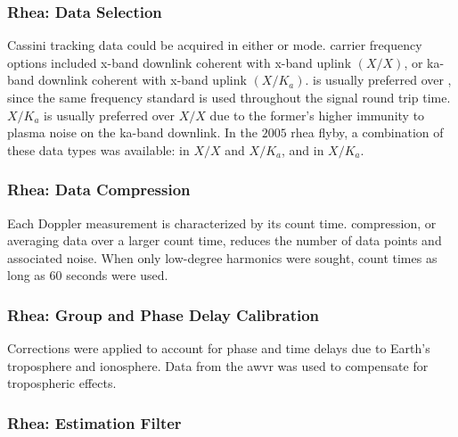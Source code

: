 \documentclass{article}
\theoremstyle{mystyle}
\begin{document}
\subsubsection{\footnotesize Rhea: Data Selection}

Cassini tracking data could be acquired in either  or  mode. \Gls{carrier} frequency options included \gls{x-band} \gls{downlink} \gls{coherent} with \gls{x-band} \gls{uplink} $(X/X)$, or \gls{ka-band} \gls{downlink} \gls{coherent} with \gls{x-band} uplink $(X/K_{a})$.  is usually preferred over , since the same \gls{frequency} standard is used throughout the signal round trip time. $X/K_{a}$ is usually preferred over $X/X$ due to the former’s higher immunity to \gls{plasma} noise on the \gls{ka-band} \gls{downlink}. In the $2005$ \gls{rhea} flyby, a combination of these data types was available:  in $X/X$ and $X/K_{a}$, and  in $X/K_{a}$.

\subsubsection{\footnotesize Rhea: Data Compression}

Each Doppler measurement is characterized by its count time. \Gls{compression}, or averaging data over a larger count time, reduces the number of data points and associated noise. When only low-degree harmonics were sought, count times as long as $60$ seconds were used.

\subsubsection{\footnotesize Rhea: Group and Phase Delay Calibration}

Corrections were applied to account for phase and time delays due to Earth's \gls{troposphere} and \gls{ionosphere}. Data from the \gls{awvr} was used to compensate for tropospheric effects.

\subsubsection{\footnotesize Rhea: Estimation Filter}
\end{document}
